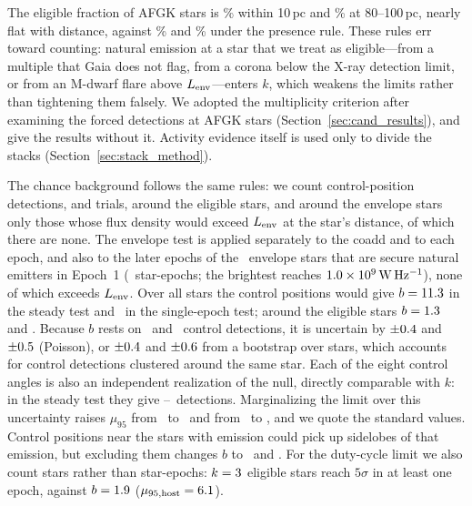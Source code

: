 \documentclass[linenumbers]{aastex702}
\newcommand{\WHz}{\mathrm{W\,Hz^{-1}}}
\begin{document}
The eligible fraction of AFGK stars is \PctEligAFGKTen\% within 10\,pc and \PctEligAFGKHundred\% at 80--100\,pc, nearly flat with distance, against \PctOldEligAFGKTen\% and \PctOldEligAFGKHundred\% under the presence rule. These rules err toward counting: natural emission at a star that we treat as eligible---from a multiple that Gaia does not flag, from a corona below the X-ray detection limit, or from an M-dwarf flare above $L_{\rm env}$---enters $k$, which weakens the limits rather than tightening them falsely. We adopted the multiplicity criterion after examining the forced detections at AFGK stars (Section~\ref{sec:cand_results}), and give the results without it. Activity evidence itself is used only to divide the stacks (Section~\ref{sec:stack_method}).



The chance background follows the same rules: we count control-position detections, and trials, around the eligible stars, and around the envelope stars only those whose flux density would exceed $L_{\rm env}$ at the star's distance, of which there are none. The envelope test is applied separately to the coadd and to each epoch, and also to the later epochs of the \NSecEnv\ envelope stars that are secure natural emitters in Epoch~1 (\NSecEnvEp\ star-epochs; the brightest reaches $\LSecEnvMax\,\WHz$), none of which exceeds $L_{\rm env}$. Over all stars the control positions would give $b=11.3$ in the steady test and \BSnapAll\ in the single-epoch test; around the eligible stars $b=1.3$ and \BSnap. Because $b$ rests on \NCtrlSteady\ and \NCtrlSnap\ control detections, it is uncertain by $\pm0.4$ and $\pm0.5$ (Poisson), or $\pm0.4$ and $\pm0.6$ from a bootstrap over stars, which accounts for control detections clustered around the same star. Each of the eight control angles is also an independent realization of the null, directly comparable with $k$: in the steady test they give \CtrlAngleMin--\CtrlAngleMax\ detections. Marginalizing the limit over this uncertainty raises $\mu_{95}$ from \MuSteady\ to \MuSteadyMarg\ and from \MuSnap\ to \MuSnapMarg, and we quote the standard values. Control positions near the stars with emission could pick up sidelobes of that emission, but excluding them changes $b$ to \BSteadyNoEmit\ and \BSnapNoEmit. For the duty-cycle limit we also count stars rather than star-epochs: $k=3$ eligible stars reach $5\sigma$ in at least one epoch, against $b=1.9$ ($\mu_{95,{\rm host}}=6.1$).
\end{document}
